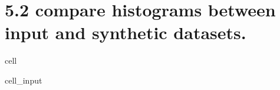 \documentclass[letterpaper,10pt,english]{jupyterBook}
\begin{document}
\section{5.2 compare histograms between input and synthetic datasets.}
\label{\detokenize{src/test/SynthNAV0:id14}}
\begin{sphinxuseclass}{cell}\begin{sphinxVerbatimInput}

\begin{sphinxuseclass}{cell_input}
\begin{sphinxVerbatim}[commandchars=\\\{\}]
   
\end{sphinxVerbatim}

\end{sphinxuseclass}\end{sphinxVerbatimInput}
\begin{sphinxVerbatimOutput}


\end{sphinxVerbatimOutput}
\end{sphinxuseclass}
\end{document}
